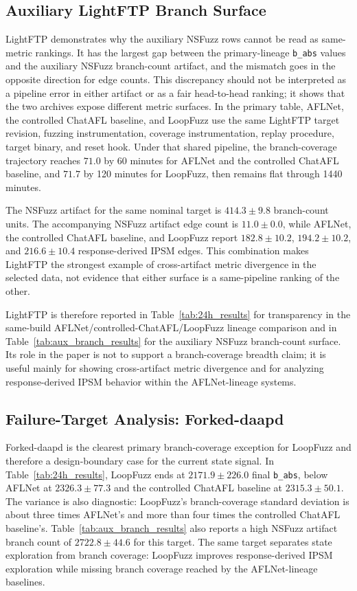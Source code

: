 \documentclass[final,5p,times,number]{elsarticle}
\begin{document}
\subsection{Auxiliary LightFTP Branch Surface}
\label{sec:lightftp_anomaly}

LightFTP demonstrates why the auxiliary NSFuzz rows cannot be read as same-metric rankings. It has the largest gap between the primary-lineage \texttt{b\_abs} values and the auxiliary NSFuzz branch-count artifact, and the mismatch goes in the opposite direction for edge counts. This discrepancy should not be interpreted as a pipeline error in either artifact or as a fair head-to-head ranking; it shows that the two archives expose different metric surfaces. In the primary table, AFLNet, the controlled ChatAFL baseline, and LoopFuzz use the same LightFTP target revision, fuzzing instrumentation, coverage instrumentation, replay procedure, target binary, and reset hook. Under that shared pipeline, the branch-coverage trajectory reaches $71.0$ by 60 minutes for AFLNet and the controlled ChatAFL baseline, and $71.7$ by 120 minutes for LoopFuzz, then remains flat through 1440 minutes.

The NSFuzz artifact for the same nominal target is $414.3{\pm}9.8$ branch-count units. The accompanying NSFuzz artifact edge count is $11.0{\pm}0.0$, while AFLNet, the controlled ChatAFL baseline, and LoopFuzz report $182.8{\pm}10.2$, $194.2{\pm}10.2$, and $216.6{\pm}10.4$ response-derived IPSM edges. This combination makes LightFTP the strongest example of cross-artifact metric divergence in the selected data, not evidence that either surface is a same-pipeline ranking of the other.

LightFTP is therefore reported in Table~\ref{tab:24h_results} for transparency in the same-build AFLNet/controlled-ChatAFL/LoopFuzz lineage comparison and in Table~\ref{tab:aux_branch_results} for the auxiliary NSFuzz branch-count surface. Its role in the paper is not to support a branch-coverage breadth claim; it is useful mainly for showing cross-artifact metric divergence and for analyzing response-derived IPSM behavior within the AFLNet-lineage systems.

\subsection{Failure-Target Analysis: Forked-daapd}
\label{sec:forked_failure}

Forked-daapd is the clearest primary branch-coverage exception for LoopFuzz and therefore a design-boundary case for the current state signal. In Table~\ref{tab:24h_results}, LoopFuzz ends at $2171.9{\pm}226.0$ final \texttt{b\_abs}, below AFLNet at $2326.3{\pm}77.3$ and the controlled ChatAFL baseline at $2315.3{\pm}50.1$. The variance is also diagnostic: LoopFuzz's branch-coverage standard deviation is about three times AFLNet's and more than four times the controlled ChatAFL baseline's. Table~\ref{tab:aux_branch_results} also reports a high NSFuzz artifact branch count of $2722.8{\pm}44.6$ for this target. The same target separates state exploration from branch coverage: LoopFuzz improves response-derived IPSM exploration while missing branch coverage reached by the AFLNet-lineage baselines.
\end{document}
